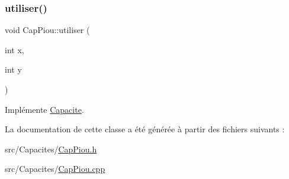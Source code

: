 \subsubsection{\texorpdfstring{utiliser()}{utiliser()}}
{\footnotesize\ttfamily void Cap\+Piou\+::utiliser (\begin{DoxyParamCaption}\item[{int}]{x,  }\item[{int}]{y }\end{DoxyParamCaption})\hspace{0.3cm}{\ttfamily [virtual]}}



Implémente \hyperlink{class_capacite_a4d4f643987fcc2168567bf28a36ea418}{Capacite}.



La documentation de cette classe a été générée à partir des fichiers suivants \+:\begin{DoxyCompactItemize}
\item 
src/\+Capacites/\hyperlink{_cap_piou_8h}{Cap\+Piou.\+h}\item 
src/\+Capacites/\hyperlink{_cap_piou_8cpp}{Cap\+Piou.\+cpp}\end{DoxyCompactItemize}
